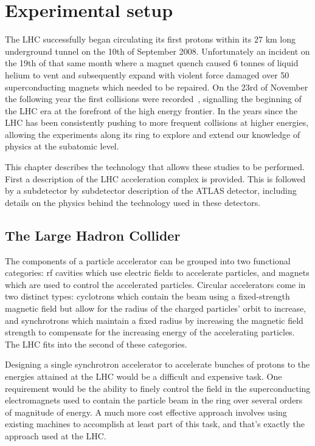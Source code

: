 \chapter{Experimental setup}
\label{Experiment}
The \gls{LHC} successfully began circulating its first protons within its 27 km long underground tunnel on the 10th of September 2008.  
Unfortunately an incident on the 19th of that same month where a magnet quench caused 6 tonnes of liquid helium to vent and subsequently expand with violent force damaged over 50 superconducting magnets which needed to be repaired.   
On the 23rd of November the following year the first collisions were recorded~\cite{FirstCollisions}, signalling the beginning of the LHC era at the forefront of the high energy frontier.  
In the years since the LHC has been consistently pushing to more frequent collisions at higher energies, allowing the experiments along its ring to explore and extend our knowledge of physics at the subatomic level.  

This chapter describes the technology that allows these studies to be performed.  
First a description of the LHC acceleration complex is provided.  
This is followed by a subdetector by subdetector description of the ATLAS detector, including details on the physics behind the technology used in these detectors.  

\section{The Large Hadron Collider}
\label{Sec:LHC}

The components of a particle accelerator can be grouped into two functional categories: rf cavities which use electric fields to accelerate particles, and magnets which are used to control the accelerated particles.  
Circular accelerators come in two distinct types: cyclotrons which contain the beam using a fixed-strength magnetic field but allow for the radius of the charged particles' orbit to increase, and synchrotrons which maintain a fixed radius by increasing the magnetic field strength to compensate for the increasing energy of the accelerating particles.  
The LHC fits into the second of these categories.  

Designing a single synchrotron accelerator to accelerate bunches of protons to the energies attained at the LHC would be a difficult and expensive task.
One requirement would be the ability to finely control the field in the superconducting electromagnets used to contain the particle beam in the ring over several orders of magnitude of energy.  
A much more cost effective approach involves using existing machines to accomplish at least part of this task, and that's exactly the approach used at the LHC.  

